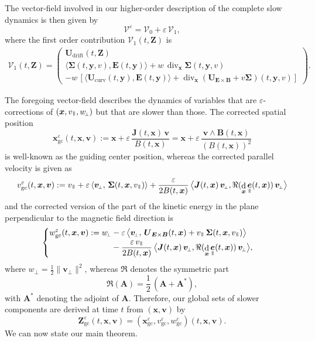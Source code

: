 \documentclass[10pt]{amsart}
\let\mathcal\mathscr
\newenvironment{splitcases}
{\begin{cases}\begin{aligned}}
{\end{aligned}\end{cases}}
\newcommand{\sperp}{{\scriptscriptstyle\perp}}
\newcommand{\blangle}{\bigl\langle}
\newcommand{\brangle}{\bigr\rangle}
\let\eps\varepsilon
\DeclareMathOperator\dD{d}\let\dd\dD
\DeclareMathOperator{\Div}{div}
\theoremstyle{plain}
\theoremstyle{definition}
\newcommand\bp{\begin{pmatrix}}
\newcommand\ep{\end{pmatrix}}
\newcommand{\be}{\begin{equation}}
\newcommand{\ee}{\end{equation}}
\newcommand\bA{{\boldsymbol A}}
\newcommand\bB{{\boldsymbol B}}
\newcommand\bE{{\boldsymbol E}}
\newcommand\bJ{{\boldsymbol J}}
\newcommand\bU{{\boldsymbol U}}
\newcommand\bfv{{\boldsymbol v}}
\newcommand\bfx{{\boldsymbol x}}
\newcommand\bfy{{\boldsymbol y}}
\newcommand\bfZ{{\boldsymbol Z}}
\newcommand\Sig{{\boldsymbol \Sigma}}
\newcommand\cV{{\mathcal V}}
\DeclareMathOperator{\beD}{\boldsymbol{e}}
\newcommand\eDpar{\beD_\mypar}
\newcommand\vpar{v_\mypar}
\newcommand\bvperp{\bfv_{\!\sperp}}
\newcommand\eperp{w_{\!\sperp}}
\let\e w
\newcommand{\GC}{\bfx_\mathrm{gc}}
\newcommand{\eGC}{w_\mathrm{gc}}
\newcommand{\vGC}{v_\mathrm{gc}}
\newcommand{\EcB}{\bU_{\bE\times\bB}}
\newcommand{\curvB}{\bU_{\mathrm{curv}}}
\newcommand{\Ud}{\bU_{\mathrm{drift}}}
\newcommand{\mypar}{{\mkern3mu\vphantom{\perp}\vrule depth 0pt\mkern2mu\vrule depth 0pt\mkern3mu}}
\begin{document}
The vector-field involved in our higher-order description of the complete slow dynamics is then given by
\begin{equation}
\label{V:eps}
\cV^\eps = \cV_0 + \eps\, \cV_1,
\end{equation}
where the first order contribution $\cV_1(t,\bfZ)$ is
\begin{align}
\label{V:1}
\cV_1(t,\bfZ)
= \bp
\Ud(t,\bfZ)
\\
\blangle\Sig(t,\bfy,v),\bE(t,\bfy)\brangle
+\e\,\Div_\bfx\Sig(t,\bfy,v)
\\
 - \e\,\left[\blangle
\curvB(t,\bfy),\bE(t,\bfy)\brangle + \Div_\bfx\left(\EcB+v\Sig\right)(t,\bfy,v)\right]
\ep.
\end{align}

The foregoing vector-field describes the dynamics of variables that are $\eps$-corrections of $(\bfx,\vpar,\eperp)$ but that are slower than those. The corrected spatial position
\be
\label{GC}
\GC^\eps (t,\bfx,\bfv) :=\bfx+\eps\,\frac{\bJ(t,\bfx)\,\bfv}{B(t,\bfx)}
=\bfx+\eps\,\frac{\bfv\wedge \bB(t,\bfx)}{(B(t,\bfx))^2}
\ee
is well-known as the guiding center position, whereas the corrected
parallel velocity is given as\vspace*{-3pt}
\be
\label{vGC}
\vGC^\eps (t,\bfx,\bfv):= \vpar
 +
\eps\,\langle\bvperp,\,\Sig(t,\bfx,\vpar)\rangle
+ \frac{\eps}{2 B(t,\bfx)} \,\blangle\bJ(t,\bfx)\,\bvperp,\Re(\dD_\bfx\eDpar(t,\bfx))\,\bvperp\brangle
\ee
and the corrected version of the part of the kinetic energy in the plane perpendicular to the magnetic field direction is
\be
\label{eGC}
\begin{splitcases}
\eGC^\eps(t,\bfx,\bfv) :=\eperp
&-\eps\,\blangle\bvperp,\,
\EcB(t,\bfx)+\vpar\,\Sig(t,\bfx,\vpar)\brangle
\\
&-\dfrac{\eps\,\vpar}{2B(t,\bfx)} \,\blangle\bJ(t,\bfx)\,\bvperp,\Re(\dD_\bfx\eDpar(t,\bfx))\,\bvperp\brangle,
\end{splitcases}
\ee
where $\eperp=\frac{1}{2}\|\bvperp\|^2$, whereas $\Re$ denotes the symmetric part\vspace*{-3pt}
\be
\label{ReA}
\Re(\bA)=\frac{1}{2}\,(\bA+\bA^*),
\ee
with $\bA^*$ denoting the adjoint of $\bA$.
Therefore, our global sets of slower components are derived at time $t$ from
$(\bfx,\bfv)$ by
\[
\bfZ_\mathrm{gc}^\eps(t,\bfx,\bfv) =(\GC^\eps, \vGC^\eps,
\eGC^\eps)(t,\bfx,\bfv).
\]
We can now state our main theorem.
\end{document}
